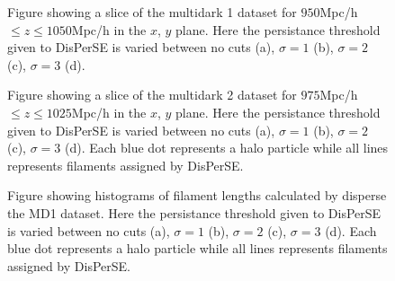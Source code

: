 \begin{figure}[H]
    \hspace{1em}%
    \hspace{1em}%
    \caption{Figure showing a slice of the multidark 1 dataset for $950$Mpc/h$\leq z\leq1050$Mpc/h in the $x$, $y$ plane. Here the persistance threshold given to DisPerSE is varied between no cuts (a), $\sigma=1$ (b), $\sigma=2$ (c), $\sigma=3$ (d).}
    \label{fig:scatterMD1}
\end{figure}
\begin{figure}[H]
    \hspace{2em}%
    \hspace{2em}%
    \caption{Figure showing a slice of the multidark 2 dataset for $975$Mpc/h $\leq z\leq1025$Mpc/h in the $x$, $y$ plane. Here the persistance threshold given to DisPerSE is varied between no cuts (a), $\sigma=1$ (b), $\sigma=2$ (c), $\sigma=3$ (d). Each blue dot represents a halo particle while all lines represents filaments assigned by DisPerSE.}
    \label{fig:scatterMD2}
\end{figure}

\begin{figure}[H]
    \hspace{1em}%
    \hspace{1em}%
    \caption{Figure showing histograms of filament lengths calculated by disperse the MD1 dataset. Here the persistance threshold given to DisPerSE is varied between no cuts (a), $\sigma=1$ (b), $\sigma=2$ (c), $\sigma=3$ (d). Each blue dot represents a halo particle while all lines represents filaments assigned by DisPerSE.}
    \label{fig:histMD1}
\end{figure}

